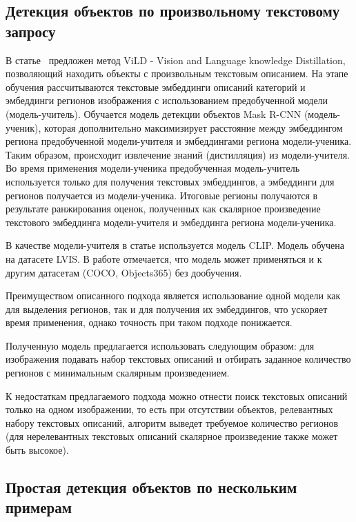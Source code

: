 \documentclass[a4paper,14pt]{article}
\begin{document}
    \subsection{Детекция объектов по произвольному текстовому запросу}

    В статье~\cite{ViLD} предложен метод ViLD - Vision and Language knowledge Distillation, позволяющий находить объекты с произвольным текстовым описанием.
    На этапе обучения рассчитываются текстовые эмбеддинги описаний категорий и эмбеддинги регионов изображения с использованием предобученной модели (модель-учитель).
    Обучается модель детекции объектов Mask R-CNN (модель-ученик), которая дополнительно максимизирует расстояние между эмбеддингом региона предобученной модели-учителя и эмбеддингами региона модели-ученика.
    Таким образом, происходит извлечение знаний (дистилляция) из модели-учителя.
    Во время применения модели-ученика предобученная модель-учитель используется только для получения текстовых эмбеддингов, а эмбеддинги для регионов получается из модели-ученика.
    Итоговые регионы получаются в результате ранжирования оценок, полученных как скалярное произведение текстового эмбеддинга модели-учителя и эмбеддинга региона модели-ученика.

    В качестве модели-учителя в статье используется модель CLIP.
    Модель обучена на датасете LVIS.
    В работе отмечается, что модель может применяться и к другим датасетам (COCO, Objects365) без дообучения.

    Преимуществом описанного подхода является использование одной модели как для выделения регионов, так и для получения их эмбеддингов, что ускоряет время применения, однако точность при таком подходе понижается.

    Полученную модель предлагается использовать следующим образом: для изображения подавать набор текстовых описаний и отбирать заданное количество регионов с минимальным скалярным произведением.

    К недостаткам предлагаемого подхода можно отнести поиск текстовых описаний только на одном изображении, то есть при отсутствии объектов, релевантных набору текстовых описаний, алгоритм выведет требуемое количество регионов (для нерелевантных текстовых описаний скалярное произведение также может быть высокое).

    \subsection{Простая детекция объектов по нескольким примерам}
\end{document}
